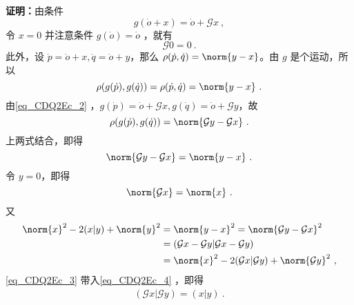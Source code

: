 \textbf{证明：}由条件
\begin{equation}\label{eq_CDQ2Ec_2}
g(\dot o+x)=\dot o+\mathcal G x~,
\end{equation}
令 $x=0$ 并注意条件 $g(\dot o)=\dot o$ ，就有
\begin{equation}
\mathcal G 0=0~.
\end{equation}
此外，设 $\dot p=\dot o+x,\dot q=\dot o+y$，那么 $\rho(\dot p,\dot q)=\norm{y-x}$。由 $g$ 是个运动，所以
\begin{equation}
\rho(g(\dot p),g(\dot q))=\rho(\dot p,\dot q)=\norm{y-x}~.
\end{equation}
由\autoref{eq_CDQ2Ec_2} ，$g(\dot p)=\dot o+\mathcal G x, g(\dot q)=\dot o+\mathcal G y$，故
\begin{equation}
\rho(g(\dot p),g(\dot q))=\norm{\mathcal Gy-\mathcal Gx}~.
\end{equation}
上两式结合，即得
\begin{equation}
\norm{\mathcal Gy-\mathcal Gx}=\norm{y-x}~.
\end{equation}
令 $y=0$，即得
\begin{equation}\label{eq_CDQ2Ec_3}
\norm{\mathcal G x}=\norm{x}~.
\end{equation}
又
\begin{equation}\label{eq_CDQ2Ec_4}
\begin{aligned}
\norm{x}^2-2(x|y)+\norm{y}^2&=\norm{y-x}^2=\norm{\mathcal G y-\mathcal G x}^2\\
&=(\mathcal G x-\mathcal G y|\mathcal G x-\mathcal G y)\\
&=\norm{x}^2-2(\mathcal G x|\mathcal G y)+\norm{\mathcal G y}^2~,
\end{aligned}
\end{equation}
\autoref{eq_CDQ2Ec_3} 带入\autoref{eq_CDQ2Ec_4} ，即得
\begin{equation}\label{eq_CDQ2Ec_5}
\begin{aligned}
(\mathcal G x|\mathcal G y)=(x|y)~.
\end{aligned}
\end{equation}

